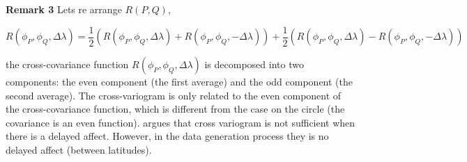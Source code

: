 	{\bf Remark 3} Lets re arrange $R(P,Q)$,  
	
	\[
		R(\phi_P, \phi_Q, \Delta \lambda) = \frac{1}{2}(R(\phi_P, \phi_Q, \Delta \lambda) + R(\phi_P, \phi_Q, -\Delta \lambda))+\frac{1}{2}(R(\phi_P, \phi_Q, \Delta \lambda) - R(\phi_P, \phi_Q, -\Delta \lambda)) 
	\]
	
	the cross-covariance function $R(\phi_P, \phi_Q, \Delta \lambda)$ is decomposed into two components: the even component (the first average) and the odd component (the second average). The cross-variogram is only related to the even component of the cross-covariance function, which is different from the case on the circle (the covariance is an even function). \cite{Wackernagel2013} argues that cross variogram is not sufficient when there is a delayed affect. However, in the data generation process they is no delayed affect (between latitudes). 
	


